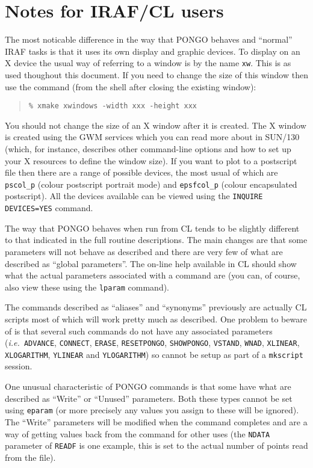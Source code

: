 \documentclass[twoside,11pt]{article}
\newcommand{\htmlref}[2]{#1}
\newcommand{\xref}[3]{#1}
\renewcommand{\_}{\texttt{\symbol{95}}}
\newcommand{\ie}{{\em i.e.\ }}
\newcommand{\pnam}[1]{{\tt #1}}
\newcommand{\cnam}[1]{{\tt #1}}
\newcommand{\iref} [1]{\htmlref{#1}{#1}}
\begin{document}
\section{Notes for IRAF/CL users}

The most noticable difference in the way that PONGO behaves and
``normal'' IRAF tasks is that it uses its own display and graphic
devices. To display on an X device the usual way of referring to a
window is by the name \verb+xw+. This is as used thoughout this
document. If you need to change the size of this window then use the
command (from the shell after closing the existing window):
\begin{quote}
\begin{verbatim}
% xmake xwindows -width xxx -height xxx
\end{verbatim}
\end{quote}
You should not change the size of an X window after it is created. 
The X window is created using the GWM services which you can read 
more about in \xref{SUN/130}{sun130}{} (which, for instance, describes
other command-line options and how to set up your X resources to define the
window size). If you want to plot to a postscript file then there are
a range of possible devices, the most usual of which are
\verb+pscol_p+ (colour postscript portrait mode) and \verb+epsfcol_p+ (colour
encapsulated postscript). All the devices available can be viewed
using the \cnam{\iref{INQUIRE} DEVICES=YES} command.

The way that PONGO behaves when run from CL tends to be slightly
different to that indicated in the full routine descriptions. The main
changes are that some parameters will not behave as described and
there are very few of what are described as ``global parameters''. The
on-line help available in CL should show what the actual parameters
associated with a command are (you can, of course, also view these
using the \verb+lparam+ command).

The commands described as ``aliases'' and ``synonyms'' previously are
actually CL scripts most of which will work pretty much as
described. One problem to beware of is that several such commands do
not have any associated parameters (\ie \cnam{ADVANCE},
\cnam{CONNECT}, \cnam{ERASE}, \cnam{RESETPONGO}, \cnam{SHOWPONGO},
\cnam{VSTAND}, \cnam{WNAD}, \cnam{XLINEAR}, \cnam{XLOGARITHM},
\cnam{YLINEAR} and \cnam{YLOGARITHM}) so cannot be setup as part of a
\verb+mkscript+ session.

One unusual characteristic of PONGO commands is that some have what
are described as ``Write'' or ``Unused'' parameters. Both these types
cannot be set using \verb+eparam+ (or more precisely any values you
assign to these will be ignored). The ``Write'' parameters will be
modified when the command completes and are a way of getting values
back from the command for other uses (the \pnam{NDATA} parameter of
\cnam{READF} is one example, this is set to the actual number of
points read from the file).
\end{document}
